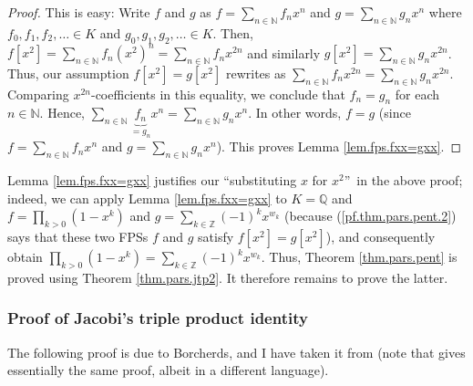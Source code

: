 \begin{proof}
This is easy: Write $f$ and $g$ as $f=\sum_{n\in\mathbb{N}}f_{n}x^{n}$ and
$g=\sum_{n\in\mathbb{N}}g_{n}x^{n}$ where $f_{0},f_{1},f_{2},\ldots\in K$ and
$g_{0},g_{1},g_{2},\ldots\in K$. Then, $f\left[  x^{2}\right]  =\sum
_{n\in\mathbb{N}}f_{n}\left(  x^{2}\right)  ^{n}=\sum_{n\in\mathbb{N}}%
f_{n}x^{2n}$ and similarly $g\left[  x^{2}\right]  =\sum_{n\in\mathbb{N}}%
g_{n}x^{2n}$. Thus, our assumption $f\left[  x^{2}\right]  =g\left[
x^{2}\right]  $ rewrites as $\sum_{n\in\mathbb{N}}f_{n}x^{2n}=\sum
_{n\in\mathbb{N}}g_{n}x^{2n}$. Comparing $x^{2n}$-coefficients in this
equality, we conclude that $f_{n}=g_{n}$ for each $n\in\mathbb{N}$. Hence,
$\sum_{n\in\mathbb{N}}\underbrace{f_{n}}_{=g_{n}}x^{n}=\sum_{n\in\mathbb{N}%
}g_{n}x^{n}$. In other words, $f=g$ (since $f=\sum_{n\in\mathbb{N}}f_{n}x^{n}$
and $g=\sum_{n\in\mathbb{N}}g_{n}x^{n}$). This proves Lemma
\ref{lem.fps.fxx=gxx}.
\end{proof}

Lemma \ref{lem.fps.fxx=gxx} justifies our \textquotedblleft substituting $x$
for $x^{2}$\textquotedblright\ in the above proof; indeed, we can apply Lemma
\ref{lem.fps.fxx=gxx} to $K=\mathbb{Q}$ and $f=\prod_{k>0}\left(
1-x^{k}\right)  $ and $g=\sum_{k\in\mathbb{Z}}\left(  -1\right)  ^{k}x^{w_{k}%
}$ (because (\ref{pf.thm.pars.pent.2}) says that these two FPSs $f$ and $g$
satisfy $f\left[  x^{2}\right]  =g\left[  x^{2}\right]  $), and consequently
obtain $\prod_{k>0}\left(  1-x^{k}\right)  =\sum_{k\in\mathbb{Z}}\left(
-1\right)  ^{k}x^{w_{k}}$. Thus, Theorem \ref{thm.pars.pent} is proved using
Theorem \ref{thm.pars.jtp2}. It therefore remains to prove the latter.

\subsubsection{Proof of Jacobi's triple product identity}

The following proof is due to Borcherds, and I have taken it from
\cite[\S 8.3]{Camero16} (note that \cite[\S 11.2]{Loehr-BC} gives essentially
the same proof, albeit in a different language).

